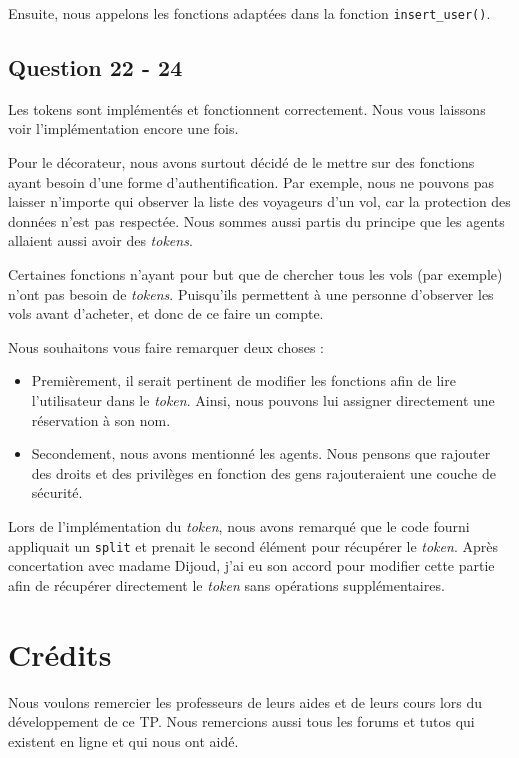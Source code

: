 \documentclass{ceri/sty/rapport}
\begin{document}
Ensuite, nous appelons les fonctions adaptées dans la fonction \texttt{insert\_user()}.

\subsection{Question 22 - 24}
Les tokens sont implémentés et fonctionnent correctement.
Nous vous laissons voir l'implémentation encore une fois.

Pour le décorateur, nous avons surtout décidé de le mettre sur des fonctions ayant besoin d'une forme d'authentification.
Par exemple, nous ne pouvons pas laisser n'importe qui observer la liste des voyageurs d'un vol, car la protection des données n'est pas respectée.
Nous sommes aussi partis du principe que les agents allaient aussi avoir des \textit{tokens}.

Certaines fonctions n'ayant pour but que de chercher tous les vols (par exemple) n'ont pas besoin de \textit{tokens}.
Puisqu'ils permettent à une personne d'observer les vols avant d'acheter, et donc de ce faire un compte.

Nous souhaitons vous faire remarquer deux choses :

\begin{itemize}
    \item Premièrement, il serait pertinent de modifier les fonctions afin de lire l'utilisateur dans le \textit{token}. 
    Ainsi, nous pouvons lui assigner directement une réservation à son nom.
    \item Secondement, nous avons mentionné les agents.
    Nous pensons que rajouter des droits et des privilèges en fonction des gens rajouteraient une couche de sécurité. 
\end{itemize}


\begin{beware}[Remarque]
Lors de l'implémentation du \textit{token}, nous avons remarqué que le code fourni appliquait un \texttt{split} et prenait le second élément pour récupérer le \textit{token}.
Après concertation avec madame Dijoud, j'ai eu son accord pour modifier cette partie afin de récupérer directement le \textit{token} sans opérations supplémentaires.
\end{beware}

\section{Crédits}
Nous voulons remercier les professeurs de leurs aides et de leurs cours lors du développement de ce TP.
Nous remercions aussi tous les forums et tutos qui existent en ligne et qui nous ont aidé.
\end{document}
